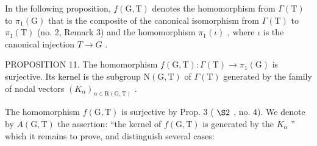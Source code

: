 In the following proposition, \(f(\mathrm{G},\mathrm{T})\) denotes the homomorphism from \(\varGamma(\mathrm{T})\) to \(\pi_{1}(\mathrm{G})\) that is the composite of the canonical isomorphism from \(\varGamma(\mathrm{T})\) to \(\pi_{1}(\mathrm{T})\) (no. 2, Remark 3) and the homomorphism \(\pi_{1}(\iota)\) , where \(\iota\) is the canonical injection \(T\to G\) .

PROPOSITION 11. The homomorphism \(f(\mathrm{G},\mathrm{T}) : \Gamma(\mathrm{T}) \to \pi_1(\mathrm{G})\) is surjective. Its kernel is the subgroup \(\mathrm{N}(\mathrm{G},\mathrm{T})\) of \(\Gamma(\mathrm{T})\) generated by the family of nodal vectors \((K_{\alpha})_{\alpha \in \mathrm{R}(\mathrm{G},\mathrm{T})}\) .

The homomorphism \(f(\mathrm{G},\mathrm{T})\) is surjective by Prop. 3 ( \(\S2\) , no. 4). We denote by \(A(\mathrm{G},\mathrm{T})\) the assertion: ``the kernel of \(f(\mathrm{G},\mathrm{T})\) is generated by the \(K_{\alpha}\) '' which it remains to prove, and distinguish several cases:

